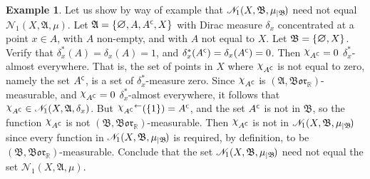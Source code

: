\documentclass[
twoside=true,
paper=letter,
fontsize=11pt,
pagesize=auto,
leqno,
openany,
headsepline,
overfullrule,
]{scrbook}
\theoremstyle{plain}
\theoremstyle{plain}
\theoremstyle{definition}
\newtheorem{example}[thm]{Example}
\theoremstyle{bfnoteitalic}
\theoremstyle{bfnoteroman}
\newcommand{\sigalg}[1]{\mathfrak{#1}}
\newcommand{\cali}[1]{\mathscr{#1}}
\newcommand{\borel}{\mathfrak{Bor}}
\newcommand{\charfunction}[1]{{\raisebox{2pt}{$\chi$}}_{#1}}
\newcommand{\restrictedto}[1]{_{\lvert#1}\kern-1.5pt}
\newcommand{\mtset}{\hbox{\large{$\varnothing$}}}
\newcommand{\comp}{^{\hbox{\tiny{$\mathsf C$}}}}
\newcommand{\preimage}[1]{#1^{\leftarrow}}
\newcommand{\R}{\mathbb{R}}
\newcommand{\sigmaalgebra}{\sigalg{A}}
\newcommand{\sigmaalgebraii}{\sigalg{B}}
\newcommand{\measurespace}{X}
\newcommand{\mspaceelt}{x}
\newcommand{\measure}{\mu}
\newcommand{\diracmeasure}[1]{\delta_{#1}}
\newcommand{\seti}{A}
\begin{document}
\begin{example}\label{unequal_kernel}
Let us show by way of example that 
$\cali{N}_1(\measurespace, \sigmaalgebraii, \measure\restrictedto{\sigmaalgebraii})$
need not equal 
$\cali{N}_1(\measurespace, \sigmaalgebra, \measure)$.
Let 
$\sigmaalgebra = 
\{ 
\mtset,
\seti,
\seti\comp,
\measurespace
\}$
with Dirac measure $\diracmeasure{\mspaceelt}$ concentrated at a point $\mspaceelt\in\seti$, with $\seti$ non-empty, and with $\seti$ not equal to $\measurespace$. 
Let
$\sigmaalgebraii = 
\{ 
\mtset,
\measurespace
\}$.  Verify that 
$\diracmeasure{\mspaceelt}^*(\seti)=\diracmeasure{\mspaceelt}(\seti)=1$, and
$\diracmeasure{\mspaceelt}^*(\seti\comp)=\diracmeasure{\mspaceelt}(\seti\comp)=0$.
Then $\charfunction{\seti\comp} = 0$ $\diracmeasure{\mspaceelt}^*$-almost everywhere. 
That is, the set of points in $\measurespace$ where $\charfunction{\seti\comp}$ is not equal to zero, namely the set 
$\seti\comp$, is a set of $\diracmeasure{\mspaceelt}^*$-measure zero.
Since $\charfunction{\seti\comp}$ is $(\sigmaalgebra,\borel_\R)$\hyp{}measurable, 
and
$\charfunction{\seti\comp} = 0$ $\diracmeasure{\mspaceelt}^*$-almost everywhere,
it follows that
$\charfunction{\seti\comp}\in
\cali{N}_1(\measurespace, \sigmaalgebra,\diracmeasure{\mspaceelt})$.
But $\preimage{{\charfunction{\seti\comp}}}{(\{1\})} =\seti\comp$, 
and the set $\seti\comp$ is not in $\sigmaalgebraii$, 
so the function 
$\charfunction{\seti\comp}$ is not  $(\sigmaalgebraii,\borel_\R)$\hyp{}measurable. Then 
$\charfunction{\seti\comp}$
is not in 
$\cali{N}_1(\measurespace, \sigmaalgebraii, \measure\restrictedto{\sigmaalgebraii})$
since every function in 
$\cali{N}_1(\measurespace, \sigmaalgebraii, \measure\restrictedto{\sigmaalgebraii})$
is required, by definition, to be 
$(\sigmaalgebraii,\borel_\R)$\hyp{}measurable.
Conclude that the set
$\cali{N}_1(\measurespace, \sigmaalgebraii, \measure\restrictedto{\sigmaalgebraii})$
need not equal the set
$\cali{N}_1(\measurespace, \sigmaalgebra, \measure)$.
\end{example}
\end{document}
